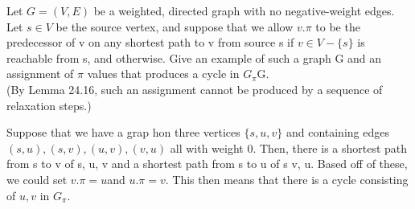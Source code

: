 \documentclass[a4paper, justified]{tufte-handout}
\begin{document}
\begin{problem}[TC 24.5-5]
Let $G = (V, E)$ be a weighted, directed graph with no negative-weight edges. Let $s \in V$ be the source vertex, and suppose that we allow $v.\pi$ to be the predecessor of v on any shortest path to v from source s if $v \in V - \{s\}$ is reachable from s, and  otherwise. Give an example of such a graph G and an assignment of $\pi$ values that produces a cycle in $G_\pi$G.\\
(By Lemma 24.16, such an assignment cannot be produced by a sequence of relaxation steps.)
\end{problem}

\begin{solution}
	Suppose that we have a grap hon three vertices $\{s, u, v\}$ and containing edges $(s, u), (s, v), (u, v), (v, u)$ all with weight 0. Then, there is a shortest path from s to v of s, u, v and a shortest path from s to u of s v, u. Based off of these, we could set $v.\pi = u$and $u.\pi = v$. This then means that there is a cycle consisting of $u, v$ in $G_\pi$.
\end{solution}

\begin{problem}[TC Problem 24-3]
\end{problem}
\end{document}
